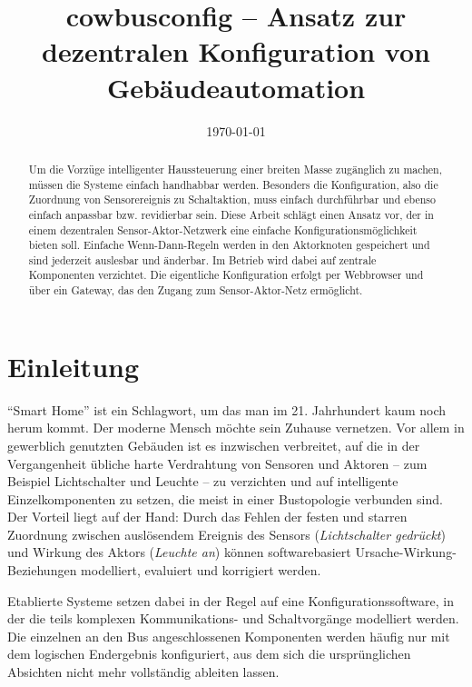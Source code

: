 \documentclass[conference]{IEEEtran}
\begin{document}
\title{cowbusconfig -- Ansatz zur dezentralen Konfiguration von Gebäudeautomation}
\author{
\and
{} 
}
\date{\today}



\maketitle

\begin{abstract}
    Um die Vorzüge intelligenter Haussteuerung einer breiten Masse zugänglich
    zu machen, müssen die Systeme einfach handhabbar werden.
    Besonders die Konfiguration, also die Zuordnung von Sensorereignis zu
    Schaltaktion, muss einfach durchführbar und ebenso einfach anpassbar
    bzw. revidierbar sein. Diese Arbeit schlägt einen Ansatz vor,
    der in einem dezentralen Sensor-Aktor-Netzwerk eine einfache
    Konfigurationsmöglichkeit bieten soll.
    Einfache Wenn-Dann-Regeln werden in den Aktorknoten gespeichert und
    sind jederzeit auslesbar und änderbar.
    Im Betrieb wird dabei auf zentrale Komponenten verzichtet.
    Die eigentliche Konfiguration erfolgt per Webbrowser und über ein Gateway,
    das den Zugang zum Sensor-Aktor-Netz ermöglicht.
\end{abstract}

\section{Einleitung}
    \enquote{Smart Home} ist ein Schlagwort, um das man im 21. Jahrhundert
    kaum noch herum kommt. Der moderne Mensch möchte sein Zuhause vernetzen.
    Vor allem in gewerblich genutzten Gebäuden ist es inzwischen verbreitet,
    auf die in der Vergangenheit übliche harte Verdrahtung von Sensoren und
    Aktoren -- zum Beispiel Lichtschalter und Leuchte -- zu verzichten
    und auf intelligente Einzelkomponenten zu setzen, die meist in einer
    Bustopologie verbunden sind. Der Vorteil liegt auf der Hand:
    Durch das Fehlen der festen und starren Zuordnung zwischen auslösendem
    Ereignis des Sensors (\emph{Lichtschalter gedrückt})
    und Wirkung des Aktors (\emph{Leuchte an})
    können softwarebasiert Ursache-Wirkung-Beziehungen modelliert, evaluiert
    und korrigiert werden.

    Etablierte Systeme setzen dabei in der Regel auf eine
    Konfigurationssoftware, in der die teils komplexen Kommunikations- und
    Schaltvorgänge modelliert werden.
    Die einzelnen an den Bus angeschlossenen Komponenten werden häufig nur
    mit dem logischen Endergebnis konfiguriert,
    aus dem sich die ursprünglichen Absichten nicht mehr vollständig ableiten
    lassen.
\end{document}
